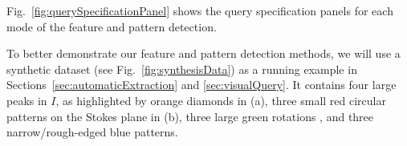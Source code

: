 Fig.~\ref{fig:querySpecificationPanel} shows the query specification panels for each mode of the feature and pattern detection.


To better demonstrate our feature and pattern detection methods, we will use a synthetic dataset (see Fig.~\ref{fig:synthesisData}) as a running example in Sections~\ref{sec:automaticExtraction} and \ref{sec:visualQuery}.
It contains four large peaks in $I$, as highlighted by orange diamonds in (a), three small red circular patterns on the Stokes plane in (b), three large green rotations , and three narrow/rough-edged blue patterns.

